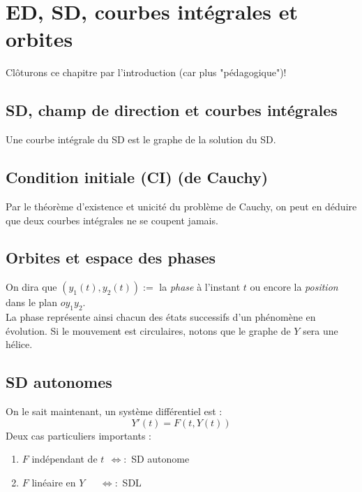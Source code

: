 \documentclass	[11pt, a4paper, openany]{book}
\begin{document}
	\setcounter{section}{0}
	\section{ED, SD, courbes intégrales et orbites}
	Clôturons ce chapitre par l'introduction (car plus "pédagogique")! 
	\subsection{SD, champ de direction et courbes intégrales}
	Une courbe intégrale du SD est le graphe de la solution du SD.
	
	\subsection{Condition initiale (CI) (de Cauchy)}
	Par le théorème d'existence et unicité du problème de Cauchy, on peut en déduire que deux courbes intégrales ne se coupent jamais.
	
	\subsection{Orbites et espace des phases}
	On dira que $(y_1(t), y_2(t)) :=$ la \textit{phase} à l'instant $t$ ou encore la \textit{position} dans le plan $oy_1y_2$.\\
	La phase représente ainsi chacun des états successifs d'un phénomène en évolution. Si le mouvement est circulaires, notons que le graphe de $Y$ sera une hélice.
	
	\subsection{SD autonomes}
	On le sait maintenant, un système différentiel est :
	\begin{equation}
		Y'(t) = F(t, Y(t))
	\end{equation}
	Deux cas particuliers importants : 
	\begin{enumerate}
		\item $F$ indépendant de $t\ \ \Leftrightarrow : $ SD autonome
		\item $F$ linéaire en $Y\ \ \ \ \ \ \ \Leftrightarrow : $ SDL
	\end{enumerate}
	
	
	
	
	
	
	
	
	
	
	
	
	
\end{document}
